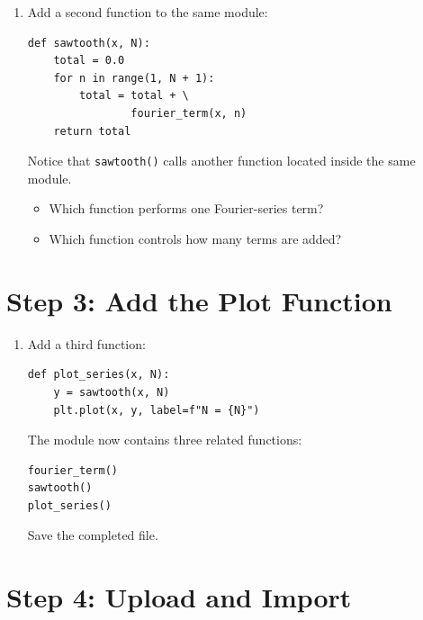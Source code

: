 \documentclass{article}
\begin{document}
\begin{enumerate}

\item Add a second function to the same module:

\begin{verbatim}
def sawtooth(x, N):
    total = 0.0
    for n in range(1, N + 1):
        total = total + \
                fourier_term(x, n)
    return total
\end{verbatim}

Notice that \texttt{sawtooth()} calls another function located inside the same module.

\begin{itemize}

\item Which function performs one Fourier-series term?

\item Which function controls how many terms are added?

\end{itemize}

\end{enumerate}


\section{Step 3: Add the Plot Function}

\begin{enumerate}

\item Add a third function:

\begin{verbatim}
def plot_series(x, N):
    y = sawtooth(x, N)
    plt.plot(x, y, label=f"N = {N}")
\end{verbatim}

The module now contains three related functions:

\begin{verbatim}
fourier_term()
sawtooth()
plot_series()
\end{verbatim}

Save the completed file.

\end{enumerate}


\section{Step 4: Upload and Import}
\end{document}

